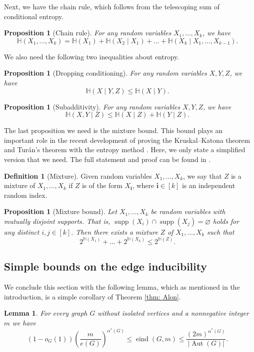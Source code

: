 \documentclass[reqno,11pt]{amsart}
\numberwithin{equation}{section}
\newtheorem{proposition}[theorem]{Proposition}
\newtheorem{lemma}[theorem]{Lemma}
\theoremstyle{definition}
\newtheorem{definition}[theorem]{Definition}
\theoremstyle{remark}
\newcommand{\abs}[1]{\left\lvert#1\right\rvert}
\DeclareMathOperator{\eind}{eind}
\DeclareMathOperator{\Aut}{Aut}
\DeclareMathOperator{\supp}{supp}
\newcommand{\HH}{\mathbb{H}}
\begin{document}
Next, we have the chain rule, which follows from the telescoping sum of conditional entropy.
\begin{proposition}[Chain rule]
    For any random variables $X_1,\dots,X_k$, we have
    \[\HH(X_1,\dots,X_k)= \HH(X_1)+\HH(X_2\mid X_1)+\dots+\HH(X_k\mid X_1,\dots,X_{k-1}).\]
\end{proposition}

We also need the following two inequalities about entropy.
\begin{proposition}[Dropping conditioning]
    For any random variables $X,Y,Z$, we have
    \[\HH(X\mid Y,Z)\leq\HH(X\mid Y).\]
\end{proposition}
\begin{proposition}[Subadditivity]
    For any random variables $X,Y,Z$, we have
    \[\HH(X,Y\mid Z)\leq\HH(X\mid Z)+\HH(Y\mid Z).\]
\end{proposition}

The last proposition we need is the mixture bound. This bound plays an important role in the recent development of proving the Kruskal--Katona theorem and Tur\'an's theorem with the entropy method \cite{CDSY24,ChaYu2024KK,CY24turan}. Here, we only state a simplified version that we need. The full statement and proof can be found in \cite{CY24turan}.

\begin{definition}[Mixture]
    Given random variables $X_1,\dots,X_k$, we say that $Z$ is a mixture of $X_1,\dots,X_k$ if $Z$ is of the form $X_{\mathbf{i}}$, where $\mathbf{i}\in [k]$ is an independent random index. 
\end{definition}
\begin{proposition}[Mixture bound]\label{prop:mix}
    Let $X_1,\dots,X_k$ be random variables with mutually disjoint supports. That is, $\supp(X_i)\cap\supp(X_j)=\varnothing$ holds for any distinct $i,j\in [k]$. Then there exists a mixture $Z$ of $X_1,\dots,X_k$ such that
    \[2^{\HH(X_1)}+\dots+2^{\HH(X_k)}\leq 2^{\HH(Z)}.\]
\end{proposition}


\subsection{Simple bounds on the edge inducibility}

We conclude this section with the following lemma, which as mentioned in the introduction, is a simple corollary of Theorem \ref{thm: Alon}.

\begin{lemma}\label{lem:simple bound}
    For every graph $G$ without isolated vertices and a nonnegative integer $m$ we have
    \[
        (1-o_G(1))\left(\frac{m}{e(G)}\right)^{\alpha^*(G)}\le \eind(G,m)\le \frac{(2m)^{\alpha^*(G)}}{\abs{\Aut(G)}}.
    \]
\end{lemma}
\end{document}
